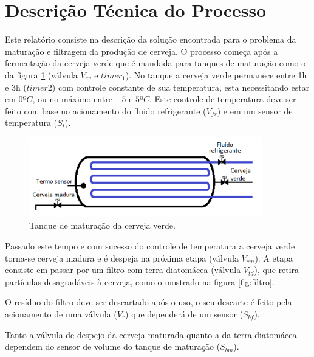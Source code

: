 \documentclass[12pt]{article}
\begin{document}
	
	
	\tableofcontents
	\listoffigures
	\listoftables
	
	\clearpage
	
	\section{Descrição Técnica do Processo}
	
	Este relatório consiste na descrição da solução encontrada para o problema da maturação e filtragem da produção de cerveja. O processo começa após a fermentação da cerveja verde que é mandada para tanques de maturação como o da figura \ref{fig:maturador} (válvula $V_{cv}$ e $timer_1$). No tanque a cerveja verde permanece entre 1h e 3h ($timer2$) com controle constante de sua temperatura, esta necessitando estar em $0ºC$, ou no máximo entre $-5$ e $5ºC$. Este controle de temperatura deve ser feito com base no acionamento do fluido refrigerante ($V_{fr}$) e em um sensor de temperatura ($S_t$).
	
	\begin{figure}[H]
		\centering
		\includegraphics [width=4in]{tanque.png}
		\caption {Tanque de maturação da cerveja verde.}
		\label{fig:maturador}
	\end{figure}
	
	Passado este tempo e com sucesso do controle de temperatura a cerveja verde torna-se cerveja madura e é despeja na próxima etapa (válvula $V_{cm}$). A etapa consiste em passar por um filtro com terra diatomácea (válvula $V_{td}$), que retira partículas desagradáveis à cerveja, como o mostrado na figura \ref{fig:filtro}. 
	
	O resíduo do filtro deve ser descartado após o uso, o seu descarte é feito pela acionamento de uma válvula ($V_r$) que dependerá de um sensor ($S_{bf}$).
	
	
	Tanto a válvula de despejo da cerveja maturada quanto a da terra diatomácea dependem do sensor de volume do tanque de maturação ($S_{bm}$).
	
\end{document}
